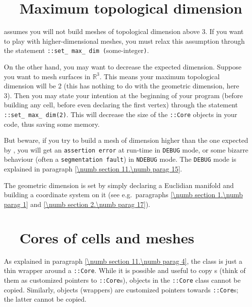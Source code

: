 \section{~~Maximum topological dimension}\label{\numb section 11.\numb parag 7}

\leavevmode {\ManiFEM} assumes you will not build meshes of topological dimension
above 3.
If you want to play with higher-dimensional meshes, you must relax this assumption
through the statement {\small\tt {}::set\_\,max\_\,dim (}some-integer{\small\tt )}.

On the other hand, you may want to decrease the expected dimension.
Suppose you want to mesh surfaces in $ \mathbb{R}^3 $.
This means your maximum topological dimension will be 2
(this has nothing to do with the geometric dimension, here 3).
Then you may state your intention at the beginning of your program
(before building any cell, before even declaring the first vertex) through
the statement {\small\tt {}::set\_\,max\_\,dim(2)}.
This will decrease the size of the {\small\tt {}::Core} objects in your code,
thus saving some memory.

But beware, if you try to build a mesh of dimension higher than the one expected by
\maniFEM, you will get an {\small\tt assertion error} at run-time in {\small\tt DEBUG} mode,
or some bizarre behaviour (often a {\small\tt segmentation fault}) in {\small\tt NDEBUG} mode.
The {\small\tt DEBUG} mode is explained in paragraph \ref{\numb section 11.\numb parag 15}.

The geometric dimension is set by simply declaring a Euclidian manifold and building
a coordinate system on it (see e.g.\ paragraphs \ref{\numb section 1.\numb parag 1}
and \ref{\numb section 2.\numb parag 17}).


\section{~~Cores of cells and meshes}\label{\numb section 11.\numb parag 8}

As explained in paragraph \ref{\numb section 11.\numb parag 4}, the {\small\tt {}}
class is just a thin wrapper around a {\small\tt {}::Core}.
While it is possible and useful to copy {\small\tt {}}s (think of them as customized
pointers to {\small\tt {}::Core}s), objects in the {\small\tt {}::Core}
class cannot be copied.
Similarly, {\small\tt {}} objects (wrappers) are customized pointers towards
{\small\tt {}::Core}s; the latter cannot be copied.

